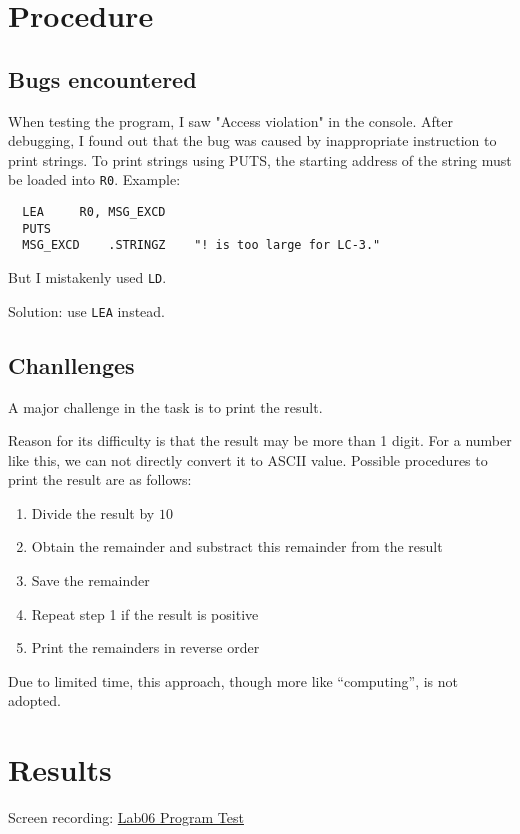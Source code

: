 \documentclass[UTF8]{ctexart}
\begin{document}
\section{Procedure}
\subsection{Bugs encountered}
When testing the program, I saw "Access violation" in the console. After debugging, I found 
out that the bug was caused by inappropriate instruction to print strings. To print strings
using PUTS, the starting address of the string must be loaded into \lstinline{R0}. Example:
\begin{lstlisting}
  LEA     R0, MSG_EXCD
  PUTS
  MSG_EXCD    .STRINGZ    "! is too large for LC-3."
\end{lstlisting}
But I mistakenly used \lstinline{LD}.

Solution: use \lstinline{LEA} instead.

\subsection{Chanllenges}
A major challenge in the task is to print the result.

Reason for its difficulty is that the result may be more than 1 digit. For a number
like this, we can not directly convert it to ASCII value. Possible procedures to print the result
are as follows:
\begin{enumerate}
  \item Divide the result by $10$
  \item Obtain the remainder and substract this remainder from the result
  \item Save the remainder
  \item Repeat step 1 if the result is positive
  \item Print the remainders in reverse order
\end{enumerate}
Due to limited time, this approach, though more like “computing”, is not adopted.

\section{Results}
Screen recording: \href{https://rec.ustc.edu.cn/share/8b6ad340-a749-11ee-a899-95416037a7ff}{Lab06 Program Test} 
\end{document}
